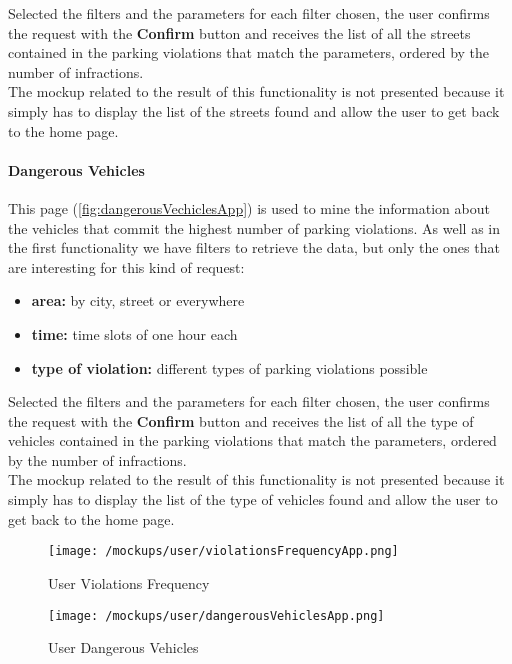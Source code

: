 			Selected the filters and the parameters for each filter chosen, the user confirms the request with the \textbf{Confirm} button and receives the list of all the streets contained in the parking violations that match the parameters, ordered by the number of infractions.\\
			
			The mockup related to the result of this functionality is not presented because it simply has to display the list of the streets found and allow the user to get back to the home page.
			
			\paragraph{Dangerous Vehicles}
			This page (\autoref{fig:dangerousVechiclesApp}) is used to mine the information about the vehicles that commit the highest number of parking violations. As well as in the first functionality we have filters to retrieve the data, but only the ones that are interesting for this kind of request:
			
			\begin{itemize}
				\item \textbf{area:} by city, street or everywhere
				\item \textbf{time:} time slots of one hour each
				\item \textbf{type of violation:} different types of parking violations possible
			\end{itemize}
		
			Selected the filters and the parameters for each filter chosen, the user confirms the request with the \textbf{Confirm} button and receives the list of all the type of vehicles contained in the parking violations that match the parameters, ordered by the number of infractions.\\
			
			The mockup related to the result of this functionality is not presented because it simply has to display the list of the type of vehicles found and allow the user to get back to the home page.
			
			\vspace{0.6cm}
			
			\begin{figure}[ht!]
				\centering
				\begin{minipage}{0.5\textwidth}
					\centering
					\texttt{[image: /mockups/user/violationsFrequencyApp.png]}
					\caption{\label{fig:violationsFrequencyApp} User Violations Frequency}
				\end{minipage}\hfill
				\begin{minipage}{0.5\textwidth}
					\centering
					\texttt{[image: /mockups/user/dangerousVehiclesApp.png]}
					\caption{\label{fig:dangerousVechiclesApp} User Dangerous Vehicles}
				\end{minipage}
			\end{figure}
		
